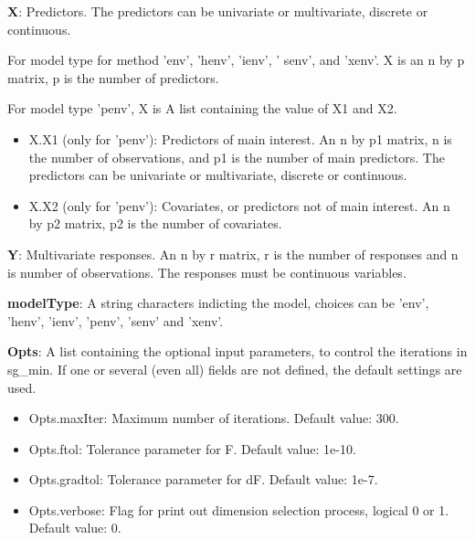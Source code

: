 \documentclass[a4paper,11pt,openany]{memoir}
\begin{document}
\begin{par}
\textbf{X}: Predictors.   The predictors can be univariate or multivariate, discrete or continuous.
\end{par} \vspace{1em}
\begin{par}
For model type for method 'env', 'henv', 'ienv', ' senv', and 'xenv'. X is an n by p matrix, p is the number of predictors.
\end{par} \vspace{1em}
\begin{par}
For model type 'penv', X is  A list containing the value of X1 and X2.
\end{par} \vspace{1em}
\begin{itemize}
\setlength{\itemsep}{-1ex}
   \item X.X1 (only for 'penv'): Predictors of main interest. An n by p1 matrix, n is the number of observations, and p1 is the number of main predictors. The predictors can be univariate or multivariate, discrete or continuous.
   \item X.X2 (only for 'penv'): Covariates, or predictors not of main interest.  An n by p2 matrix, p2 is the number of covariates.
\end{itemize}
\begin{par}
\textbf{Y}: Multivariate responses. An n by r matrix, r is the number of responses and n is number of observations. The responses must be continuous variables.
\end{par} \vspace{1em}
\begin{par}
\textbf{modelType}: A string characters indicting the model, choices can be 'env', 'henv', 'ienv', 'penv', 'senv' and 'xenv'.
\end{par} \vspace{1em}
\begin{par}
\textbf{Opts}: A list containing the optional input parameters, to control the iterations in sg\_min. If one or several (even all) fields are not defined, the default settings are used.
\end{par} \vspace{1em}
\begin{itemize}
\setlength{\itemsep}{-1ex}
   \item Opts.maxIter: Maximum number of iterations.  Default value: 300.
   \item Opts.ftol: Tolerance parameter for F.  Default value: 1e-10.
   \item Opts.gradtol: Tolerance parameter for dF.  Default value: 1e-7.
   \item Opts.verbose: Flag for print out dimension selection process, logical 0 or 1. Default value: 0.
\end{itemize}
\end{document}
